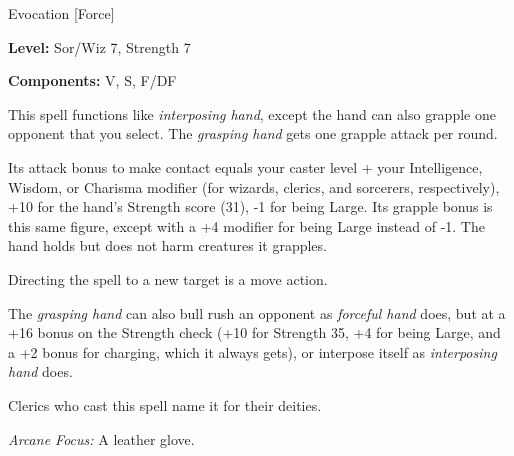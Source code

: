 
Evocation [Force]

\textbf{Level:} Sor/Wiz 7, Strength 7

\textbf{Components:} V, S, F/DF

This spell functions like \textit{interposing hand}, except the hand can also grapple 
one opponent that you select. The \textit{grasping hand} gets one grapple attack 
per round.

Its attack bonus to make contact equals your caster level + your Intelligence, 
Wisdom, or Charisma modifier (for wizards, clerics, and sorcerers, respectively), 
+10 for the hand's Strength score (31), -1 for being Large. Its grapple bonus is 
this same figure, except with a +4 modifier for being Large instead of -1. The 
hand holds but does not harm creatures it grapples.

Directing the spell to a new target is a move action.

The \textit{grasping hand} can also bull rush an opponent as \textit{forceful hand 
}does, but at a +16 bonus on the Strength check (+10 for Strength 35, +4 for being 
Large, and a +2 bonus for charging, which it always gets), or interpose itself 
as \textit{interposing hand} does.

Clerics who cast this spell name it for their deities.

\textit{Arcane Focus:} A leather glove.

